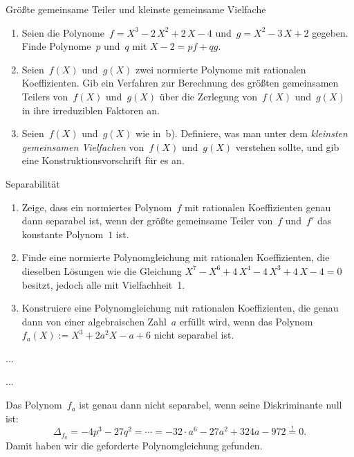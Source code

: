 \documentclass{algblatt}
\begin{document}
\vspace*{-1.5cm}

\begin{aufgabe}{Größte gemeinsame Teiler und kleinste gemeinsame Vielfache}
\begin{enumerate}
\item Seien die Polynome~$f = X^3 - 2\,X^2 + 2\,X - 4$
und~$g = X^2 - 3\,X + 2$ gegeben. Finde Polynome~$p$ und~$q$ mit
$X-2 = p f + q g$.
\item Seien~$f(X)$ und~$g(X)$ zwei normierte Polynome mit rationalen
Koeffizienten. Gib ein Verfahren zur Berechnung des größten gemeinsamen Teilers
von~$f(X)$ und~$g(X)$ über die Zerlegung von~$f(X)$ und~$g(X)$ in ihre
irreduziblen Faktoren an.
\item Seien~$f(X)$ und~$g(X)$ wie in~b). Definiere, was man unter dem
\emph{kleinsten gemeinsamen Vielfachen} von~$f(X)$ und~$g(X)$ verstehen sollte,
und gib eine Konstruktionsvorschrift für es an.
\end{enumerate}
\end{aufgabe}

\begin{aufgabe}{Separabilität}
\begin{enumerate}
\item Zeige, dass ein normiertes Polynom~$f$ mit rationalen Koeffizienten genau
dann separabel ist, 
wenn der größte gemeinsame Teiler von~$f$
und~$f'$ das konstante Polynom~$1$ ist.
\item Finde eine normierte Polynomgleichung mit rationalen
Koeffizienten, die dieselben Lösungen wie die
Gleichung $X^7-X^6+4\,X^4-4\,X^3+4\,X-4=0$ besitzt, jedoch alle mit
Vielfachheit~1.
\item Konstruiere eine Polynomgleichung mit rationalen Koeffizienten, die genau dann
von einer algebraischen Zahl~$a$ erfüllt wird, wenn das Polynom~$f_a(X) := X^3
+ 2a^2 X - a + 6$ nicht separabel ist.
\end{enumerate}

\begin{loesungE}
\item ...
\item ...
\item Das Polynom~$f_a$ ist genau dann nicht separabel, wenn seine Diskriminante null
ist:
\[ \Delta_{f_a} = -4p^3 - 27q^2 = \cdots =
  -32 \cdot a^6 - 27 a^2 + 324 a - 972 \stackrel{!}{=} 0. \]
Damit haben wir die geforderte Polynomgleichung gefunden.
\end{loesungE}
\end{aufgabe}
\end{document}
